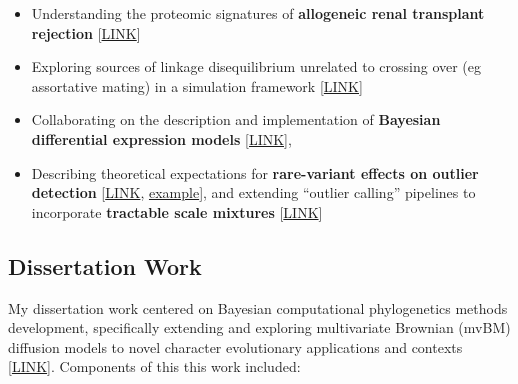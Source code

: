 \documentclass[12pt]{article}
\begin{document}
\begin{itemize}[noitemsep]
\item Understanding the proteomic signatures of \textbf{allogeneic renal transplant rejection} [\href{https://github.com/NikVetr/minor\_scripts/blob/c8926965b0c6dd9158351cf5836cbc76261f6830/postdoc/renal\_transplant\_censored\_poisson.R}{LINK}]

\item Exploring sources of linkage disequilibrium unrelated to crossing over (eg assortative mating) in a simulation framework [\href{https://github.com/NikVetr/montgomery\_lab/blob/61e2ac4b0fea0ee7f5bf31590a40378f0027264a/assortative\_mating.R}{LINK}]

\item Collaborating on the description and implementation of \textbf{Bayesian differential expression models} \href{https://github.com/bob-carpenter/BayesExpress/blob/main/latex/bayes-express/bayes-express.tex}{[LINK]},  

\item Describing theoretical expectations for \textbf{rare-variant effects on outlier detection} [\href{https://github.com/NikVetr/montgomery_lab/blob/61e2ac4b0fea0ee7f5bf31590a40378f0027264a/prop\_outliers\_zscores\_animation.R#L4}{LINK}, \href{https://drive.google.com/file/d/1mSp22\_cqarfMDFnS55Pjg7qqmkVnk1GI}{example}], and extending ``outlier calling'' pipelines to incorporate \textbf{tractable scale mixtures} [\href{https://github.com/NikVetr/minor\_scripts/blob/master/postdoc/outlier\_mixture.R}{LINK}]

\end{itemize}

\subsection{Dissertation Work}

My dissertation work centered on Bayesian computational phylogenetics methods development, specifically extending and exploring multivariate Brownian (mvBM) diffusion models to novel character evolutionary applications and contexts [\href{https://github.com/NikVetr/papers/blob/main/dissertation/dissertation_lashinsky_2020.pdf}{LINK}]. Components of this this work included:
\end{document}
